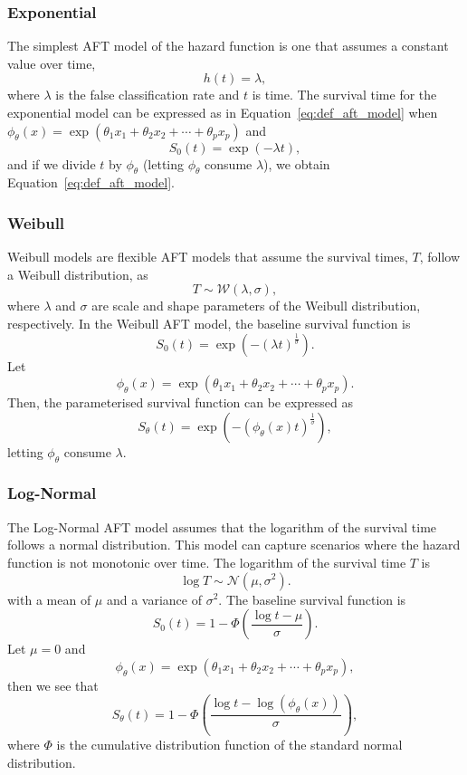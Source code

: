 \subsubsection{Exponential}
The simplest AFT model of the hazard function is one that assumes a constant value over time,
$$
    h(t) = \lambda,
$$
where $\lambda$ is the false classification rate and $t$ is time. The survival time for the exponential model can be expressed as in Equation~\ref{eq:def_aft_model} when $\phi_\theta(x) = \exp \left( \theta_1 x_1 + \theta_2 x_2 + \cdots + \theta_p x_p \right) $ and 
$$ 
    S_0(t) = \exp(-\lambda t),
$$
and if we divide $t$ by $\phi_\theta$ (letting $\phi_\theta$ consume $\lambda$), we obtain Equation~\ref{eq:def_aft_model}.





\subsubsection{Weibull}
Weibull models are flexible AFT models that assume the survival times, $T$, follow a Weibull distribution, as
$$  %
    T \sim \mathcal{W}(\lambda, \sigma),
$$
where $\lambda$ and $\sigma$ are scale and shape parameters of the Weibull distribution, respectively. In the Weibull AFT model, the baseline survival function is
$$ %
    S_0(t) = \exp( -(\lambda t)^{\frac{1}{\sigma}}).
$$
Let  
$$
    \phi_\theta(x) = \exp( \theta_1 x_1 + \theta_2 x_2 + \cdots + \theta_p x_p ).
$$
Then, the parameterised survival function can be expressed as
$$ %
    S_\theta(t) = \exp \left(- (\phi_\theta(x) t)^{\frac{1}{\sigma}} \right),
$$
letting $\phi_\theta$ consume $\lambda$.



\subsubsection{Log-Normal}
The Log-Normal AFT model assumes that the logarithm of the survival time follows a normal distribution. This model can capture scenarios where the hazard function is not monotonic over time. The logarithm of the survival time $T$ is
$$ %
   \log T \sim \mathcal{N}(\mu, \sigma^2).
$$
with a mean of $\mu$ and a variance of $\sigma^2$.
The baseline survival function is
$$ %
    S_0(t) = 1 - \Phi\left( \frac{\log t - \mu}{\sigma} \right).
$$
Let $\mu=0$ and
$$ %
    \phi_\theta(x) = \exp(\theta_1 x_1 + \theta_2 x_2 + \cdots + \theta_p x_p),
$$
then we see that
$$ %
    S_{\theta}(t) = 1 - \Phi \left( \frac{\log t  -  \log(\phi_\theta(x))}{\sigma}\right),
$$
where $\Phi$ is the cumulative distribution function of the standard normal distribution.

